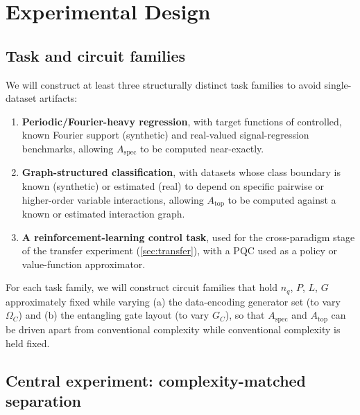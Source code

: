 \documentclass[11pt]{article}
\newcommand{\Aspec}{A_{\mathrm{spec}}}
\newcommand{\Atop}{A_{\mathrm{top}}}
\newcommand{\Omc}{\Omega_C}
\begin{document}
\section{Experimental Design}
\label{sec:experiments}

\subsection{Task and circuit families}
We will construct at least three structurally distinct task families to avoid single-dataset artifacts:
\begin{enumerate}[leftmargin=1.6em]
    \item \textbf{Periodic/Fourier-heavy regression}, with target functions of controlled, known Fourier support (synthetic) and real-valued signal-regression benchmarks, allowing $\Aspec$ to be computed near-exactly.
    \item \textbf{Graph-structured classification}, with datasets whose class boundary is known (synthetic) or estimated (real) to depend on specific pairwise or higher-order variable interactions, allowing $\Atop$ to be computed against a known or estimated interaction graph.
    \item \textbf{A reinforcement-learning control task}, used for the cross-paradigm stage of the transfer experiment (\cref{sec:transfer}), with a PQC used as a policy or value-function approximator.
\end{enumerate}
For each task family, we will construct circuit families that hold $n_q$, $P$, $L$, $G$ approximately fixed while varying (a) the data-encoding generator set (to vary $\Omc$) and (b) the entangling gate layout (to vary $G_C$), so that $\Aspec$ and $\Atop$ can be driven apart from conventional complexity while conventional complexity is held fixed.

\subsection{Central experiment: complexity-matched separation}
\label{sec:central-experiment}
\end{document}
